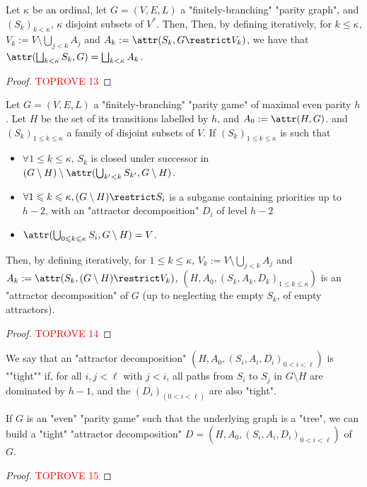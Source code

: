 \documentclass[a4paper,UKenglish,cleveref, autoref, thm-restate]{lipics-v2021}
\renewcommand{\leq}{\leqslant}
\begin{document}
\begin{lemma}\label{lem:attr-union}
	Let $\kappa$ be an ordinal, let $G=(V,E,L)$ a "finitely-branching" "parity graph", and $(S_k)_{k<\kappa}$, $\kappa$ disjoint subsets of $V^*$. Then, Then, by defining iteratively, for $k \leq \kappa$, $V_k:=V\setminus \bigcup_{j< k}A_j$ and $A_k := \attr(S_k,G\restrict V_k)$, we have that $\attr(\bigsqcup_{k<\kappa}S_k,G) = \bigsqcup_{k<\kappa} A_k$.
\end{lemma}
\begin{proof}\textcolor{red}{TOPROVE 13}\end{proof}


\begin{lemma}\label{lem:join-attr-decomp}
	Let $G = (V,E,L)$ a "finitely-branching" "parity game" of maximal even parity $h$. Let $H$ be the set of its transitions labelled by $h$, and $A_0 := \attr(H,G)$. and $(S_k)_{1\leq k\leq\kappa}$ a family of disjoint subsets of $V$. If $(S_k)_{1\leq k \leq \kappa}$ is such that
	\begin{itemize}
		\item $\forall 1 \leq k \leq \kappa$, $S_k$ is closed under successor in $(G\setminus H)\setminus \attr(\bigcup_{k'<k} S_{k'}, G\setminus H)$.
		\item $\forall 1\leq k \leq \kappa, (G\setminus H)\restrict S_i$ is a subgame containing priorities up to $h-2$, with an "attractor decomposition" $D_i$ of level $h-2$
		\item $\attr(\bigcup_{0\leq k\leq\kappa}S_i,G\setminus H) = V$.
	\end{itemize}
	Then, by defining iteratively, for $1\leq k \leq \kappa$, $V_k:=V\setminus \bigcup_{j< k}A_j$ and $A_k := \attr(S_k,(G\setminus H)\restrict V_k)$, $(H,A_0, (S_k,A_k,D_k)_{1\leq k \leq \kappa})$ is an "attractor decomposition" of $G$ (up to neglecting the empty $S_k$, of empty attractors).
\end{lemma}
\begin{proof}\textcolor{red}{TOPROVE 14}\end{proof}

\AP We say that an "attractor decomposition" $(H,A_0,(S_i,A_i,D_i)_{0<i<\ell})$ is ""tight"" if, for all $i,j < \ell$ with $j<i$, all paths from $S_i$ to $S_j$ in $G\setminus H$ are dominated by $h-1$, and the $(D_i)_{(0<i<\ell)}$ are also "tight".

\begin{lemma}\label{lem:tightAD}
	If $G$ is an "even" "parity game" such that the underlying graph is a "tree", we can build a "tight" "attractor decomposition" $D=(H,A_0,(S_i,A_i,D_i)_{0<i<\ell})$ of $G$.
\end{lemma}
\begin{proof}\textcolor{red}{TOPROVE 15}\end{proof}
\end{document}
